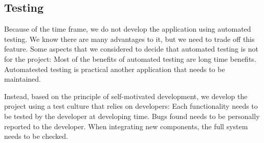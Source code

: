 \subsection{ Testing}
\indent
\indent
Because of the time frame, we do not develop the application using automated testing. We know there are many advantages to it, but we need to trade off this feature. Some aspects that we considered to decide that automated testing is not for the project:
Most of the benefits of automated testing are long time benefits.
Automatested testing is practical another application that needs to be maintained.

Instead, based on the principle of self-motivated development, we develop the project using a test culture that relies on developers:
Each functionality needs to be tested by the developer at developing time.
Bugs found needs to be personally reported to the developer.
When integrating new components, the full system needs to be checked. 

